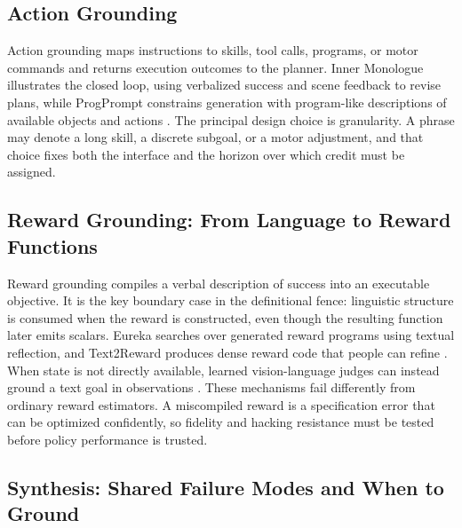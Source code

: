 \subsection{Action Grounding}
\label{subsec:action-grounding}

Action grounding maps instructions to skills, tool calls, programs, or motor commands and returns execution outcomes to the planner. Inner Monologue illustrates the closed loop, using verbalized success and scene feedback to revise plans, while ProgPrompt constrains generation with program-like descriptions of available objects and actions \citep{huang2022inner,singh2022progprompt}. The principal design choice is granularity. A phrase may denote a long skill, a discrete subgoal, or a motor adjustment, and that choice fixes both the interface and the horizon over which credit must be assigned.

\subsection{Reward Grounding: From Language to Reward Functions}
\label{subsec:reward-grounding}

Reward grounding compiles a verbal description of success into an executable objective. It is the key boundary case in the definitional fence: linguistic structure is consumed when the reward is constructed, even though the resulting function later emits scalars. Eureka searches over generated reward programs using textual reflection, and Text2Reward produces dense reward code that people can refine \citep{ma2024eureka,xie2024text2reward}. When state is not directly available, learned vision-language judges can instead ground a text goal in observations \citep{wang2024rlvlmf}. These mechanisms fail differently from ordinary reward estimators. A miscompiled reward is a specification error that can be optimized confidently, so fidelity and hacking resistance must be tested before policy performance is trusted.

\subsection{Synthesis: Shared Failure Modes and When to Ground}
\label{subsec:grounding-synthesis}

